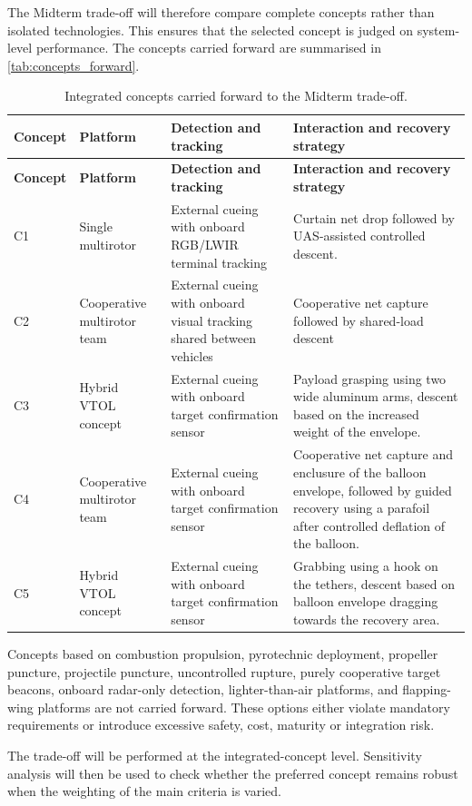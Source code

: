 The Midterm trade-off will therefore compare complete concepts rather than isolated technologies. This ensures that the selected concept is judged on system-level performance. The concepts carried forward are summarised in \autoref{tab:concepts_forward}.
\vspace{-5pt}
\begin{longtable}{p{} p{} p{} p{}}
\caption{Integrated concepts carried forward to the Midterm trade-off.} \label{tab:concepts_forward} \\
\toprule
\textbf{Concept} & \textbf{Platform} & \textbf{Detection and tracking} & \textbf{Interaction and recovery strategy} \\
\midrule
\endfirsthead

\toprule
\textbf{Concept} & \textbf{Platform} & \textbf{Detection and tracking} & \textbf{Interaction and recovery strategy} \\
\midrule
\endhead

\bottomrule
\endlastfoot

C1 & Single multirotor & External cueing with onboard RGB/LWIR terminal tracking & Curtain net drop followed by UAS-assisted controlled descent. \\ \addlinespace
C2 & Cooperative multirotor team & External cueing with onboard visual tracking shared between vehicles & Cooperative net capture followed by shared-load descent \\ \addlinespace
C3 & Hybrid VTOL concept & External cueing with onboard target confirmation sensor &  Payload grasping using two wide aluminum arms, descent based on the increased weight of the envelope. \\ \addlinespace
C4 & Cooperative multirotor team & External cueing with onboard target confirmation sensor &  Cooperative net capture and enclusure of the balloon envelope, followed by guided recovery using a parafoil after controlled deflation of the balloon. \\ \addlinespace
C5 & Hybrid VTOL concept & External cueing with onboard target confirmation sensor &   Grabbing using a hook on the tethers, descent based on balloon envelope dragging towards the recovery area. \\

\end{longtable}
\vspace{-10pt}
Concepts based on combustion propulsion, pyrotechnic deployment, propeller puncture, projectile puncture, uncontrolled rupture, purely cooperative target beacons, onboard radar-only detection, lighter-than-air platforms, and flapping-wing platforms are not carried forward. These options either violate mandatory requirements or introduce excessive safety, cost, maturity or integration risk.

The trade-off will be performed at the integrated-concept level. Sensitivity analysis will then be used to check whether the preferred concept remains robust when the weighting of the main criteria is varied.